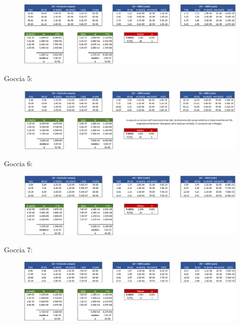 \documentclass{article}
\begin{document}
\begin{figure}[h]
\centering
\includegraphics[width=\linewidth]{Goccia4}
\end{figure}

\vspace{10mm}

Goccia 5:

\begin{figure}[h]
\centering
\includegraphics[width=\linewidth]{Goccia5}
\end{figure}

\pagebreak

Goccia 6:

\begin{figure}[h]
\centering
\includegraphics[width=\linewidth]{Goccia6}
\end{figure}

\vspace{10mm}

Goccia 7:

\begin{figure}[h]
\centering
\includegraphics[width=\linewidth]{Goccia7}
\end{figure}
\end{document}
